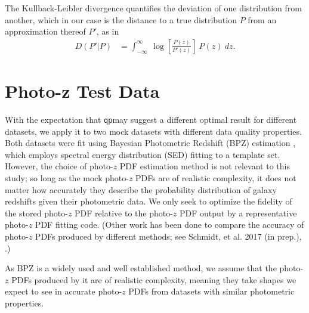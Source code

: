 \documentclass[\docopts]{\docclass}
\newcommand{\qp}{\texttt{qp}}
\begin{document}
The Kullback-Leibler divergence quantifies the deviation of one distribution from another, which in our case is the distance to a true distribution $P$ from an approximation thereof $P'$, as in
\begin{align}
  D(P' | P) &= \int_{-\infty}^{\infty}\ \log\left[\frac{P(z)}{P'(z)}\right]\ P(z)\ dz.
\end{align}




\section{Photo-z Test Data}
\label{sec:data}

With the expectation that \qp may suggest a different optimal result for different datasets, we apply it to two mock datasets with different data quality properties.  Both datasets were fit using Bayesian Photometric Redshift (BPZ) estimation \citep{benitez_bayesian_2000}, which employs spectral energy distribution (SED) fitting to a template set.  However, the choice of photo-$z$ PDF estimation method is not relevant to this study; so long as the mock photo-$z$ PDFs are of realistic complexity, it does not matter how accurately they describe the probability distribution of galaxy redshifts given their photometric data.  We only seek to optimize the fidelity of the stored photo-$z$ PDF relative to the photo-$z$ PDF output by a representative photo-$z$ PDF fitting code.  (Other work has been done to compare the accuracy of photo-$z$ PDFs produced by different methods; see Schmidt, et al. 2017 (in prep.), \citet{tanaka_photometric_2017}.)

As BPZ is a widely used and well established method, we assume that the photo-$z$ PDFs produced by it are of realistic complexity, meaning they take shapes we expect to see in accurate photo-$z$ PDFs from datasets with similar photometric properties.

\end{document}
